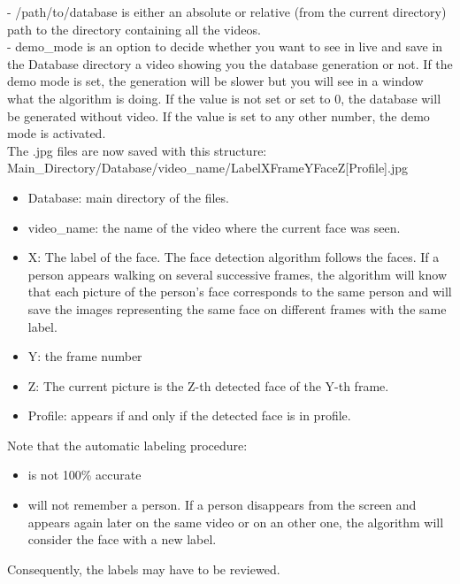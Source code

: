 - /path/to/database is either an absolute or relative (from the current directory) path to the directory containing all the videos.\\

- demo\_mode is an option to decide whether you want to see in live and save in the Database directory a video showing you the database generation or not. If the demo mode is set, the generation will be slower but you will see in a window what the algorithm is doing. If the value is not set or set to 0, the database will be generated without video. If the value is set to any other number, the demo mode is activated.\\


The .jpg files are now saved with this structure:\\

Main\_Directory/Database/video\_name/LabelXFrameYFaceZ[Profile].jpg\\

\begin{itemize}
\item Database: main directory of the files.
\item video\_name: the name of the video where the current face was seen.
\item X: The label of the face. The face detection algorithm follows the faces. If a person appears walking on several successive frames, the algorithm will know that each picture of the person’s face corresponds to the same person and will save the images representing the same face on different frames with the same label.
\item Y: the frame number
\item Z: The current picture is the Z-th detected face of the Y-th frame.
\item Profile: appears if and only if the detected face is in profile.
\end{itemize}

Note that the automatic labeling procedure:
\begin{itemize}
\item is not 100\% accurate
\item will not remember a person. If a person disappears from the screen and appears again later on the same video or on an other one, the algorithm will consider the face with a new label.
\end{itemize}

Consequently, the labels may have to be reviewed.\\

